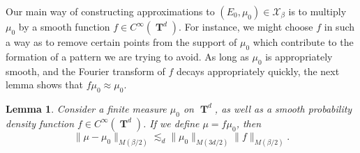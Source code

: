 \documentclass[12pt,reqno]{article}
\numberwithin{equation}{section}
\DeclareMathOperator{\TT}{\mathbf{T}}
\newtheorem{lemma}[theorem]{Lemma}
\numberwithin{theorem}{section}
\begin{document}
Our main way of constructing approximations to $(E_0,\mu_0) \in \mathcal{X}_\beta$ is to multiply $\mu_0$ by a smooth function $f \in C^\infty(\TT^d)$. For instance, we might choose $f$ in such a way as to remove certain points from the support of $\mu_0$ which contribute to the formation of a pattern we are trying to avoid. As long as $\mu_0$ is appropriately smooth, and the Fourier transform of $f$ decays appropriately quickly, the next lemma shows that $f \mu_0 \approx \mu_0$.

\begin{lemma} \label{LemmaTTSICICS}
    Consider a finite measure $\mu_0$ on $\TT^d$, as well as a smooth probability density function $f \in C^\infty(\TT^d)$. If we define $\mu = f \mu_0$, then
    \[ \| \mu - \mu_0 \|_{M(\beta/2)} \lesssim_d \| \mu_0 \|_{M(3d/2)} \| f \|_{M(\beta/2)}. \]
\end{lemma}
\end{document}
